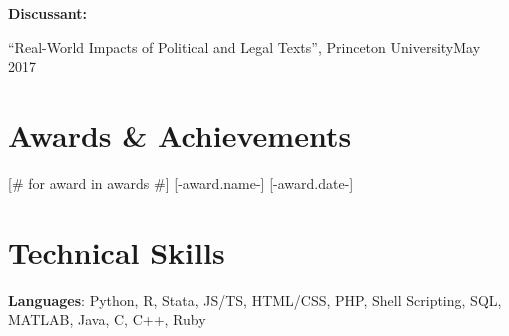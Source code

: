 \documentclass[letterpaper,11pt]{article}
\newcommand{\cvitemsep}{2mm}
\begin{document}
\begin{minipage}{\textwidth}

\textbf{Discussant:}\vspace{\cvitemsep}

``Real-World Impacts of Political and Legal Texts'', Princeton University\hfill May 2017 \\


\section{Awards \& Achievements}

[# for award in awards #]
[-award.name-] \hfill [-award.date-]\vspace{1mm} \\
[# endfor #]

\section{Technical Skills}

\textbf{Languages}: Python, R, Stata, JS/TS, HTML/CSS, PHP, Shell Scripting, SQL, MATLAB, Java, C, C++, Ruby\vspace{2mm}\\


\end{minipage}
\end{document}
